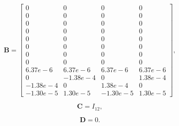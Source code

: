 \vspace{+0.3cm}

\[
\mathbf{B} = 
\left[
\begin{array}{cccccccccccc}
0 & 0 & 0 & 0\\
0 & 0 & 0 & 0\\
0 & 0 & 0 & 0\\
0 & 0 & 0 & 0\\
0 & 0 & 0 & 0\\
0 & 0 & 0 & 0\\
0 & 0 & 0 & 0\\
0 & 0 & 0 & 0\\
6.37e-6 & 6.37e-6 & 6.37e-6 & 6.37e-6\\
0 & -1.38e-4 & 0 & 1.38e-4\\
-1.38e-4 & 0 & 1.38e-4 & 0\\
-1.30e-5 & 1.30e-5 & -1.30e-5 & 1.30e-5
\end{array}\right],
\]

\vspace{+0.3cm}

\[
\mathbf{C} = I_{12},
\]

\[
\mathbf{D} = 0.
\]